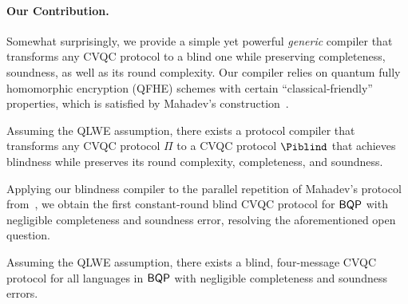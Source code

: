 \paragraph{Our Contribution.} Somewhat surprisingly, we provide a simple yet powerful  
\emph{generic}  compiler that transforms any CVQC protocol to a blind one while preserving completeness, soundness, as well as its round complexity. 
Our compiler relies on quantum fully homomorphic encryption (QFHE) schemes with certain ``classical-friendly'' properties, which is satisfied by Mahadev's construction~\cite{mahadev_qfhe}.
%
%
\begin{theorem}[informal]
Assuming the QLWE assumption, there exists a protocol compiler that transforms any CVQC protocol $\Pi$ to a CVQC protocol $\Piblind$ that achieves blindness while preserves its round complexity, completeness, and soundness.
\end{theorem}

Applying our blindness compiler to the parallel repetition of Mahadev's protocol from~\cite{arXiv:ChiaChungYam19, arXiv:AlaChiHun19}, we obtain the first constant-round blind CVQC protocol for $\operatorname{\mathsf{BQP}}$ with negligible completeness and soundness error, resolving the aforementioned open question.

\begin{theorem}[informal]
    Assuming the QLWE assumption, there exists a blind, four-message CVQC protocol for all languages in $\operatorname{\mathsf{BQP}}$ with negligible completeness and soundness errors.
\end{theorem}

